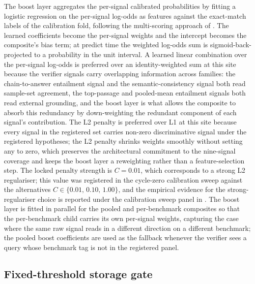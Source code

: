 The boost layer aggregates the per-signal calibrated probabilities by fitting a logistic regression on the per-signal log-odds as features against the exact-match labels of the calibration fold, following the multi-scoring approach of \cite{valentin2024hallucination}. The learned coefficients become the per-signal weights and the intercept becomes the composite's bias term; at predict time the weighted log-odds sum is sigmoid-back-projected to a probability in the unit interval. A learned linear combination over the per-signal log-odds is preferred over an identity-weighted sum at this site because the verifier signals carry overlapping information across families: the chain-to-answer entailment signal and the semantic-consistency signal both read sample-set agreement, the top-passage and pooled-mean entailment signals both read external grounding, and the boost layer is what allows the composite to absorb this redundancy by down-weighting the redundant component of each signal's contribution. The L2 penalty is preferred over L1 at this site because every signal in the registered set carries non-zero discriminative signal under the registered hypotheses; the L2 penalty shrinks weights smoothly without setting any to zero, which preserves the architectural commitment to the nine-signal coverage and keeps the boost layer a reweighting rather than a feature-selection step. The locked penalty strength is $C = 0.01$, which corresponds to a strong L2 regulariser; this value was registered in the cycle-zero calibration sweep against the alternatives $C\in\{0.01,\,0.10,\,1.00\}$, and the empirical evidence for the strong-regulariser choice is reported under the calibration sweep panel in . The boost layer is fitted in parallel for the pooled and per-benchmark composites so that the per-benchmark child carries its own per-signal weights, capturing the case where the same raw signal reads in a different direction on a different benchmark; the pooled boost coefficients are used as the fallback whenever the verifier sees a query whose benchmark tag is not in the registered panel.

\subsection{Fixed-threshold storage gate}
\label{sec:conformal-gate}

